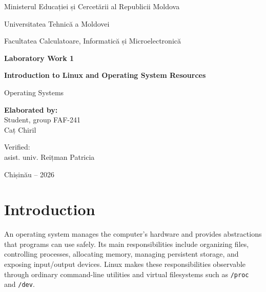 \documentclass[12pt]{article}
\newcommand{\commandname}[1]{\texttt{#1}}
\begin{document}

\begin{titlepage}
    \centering

    {\large Ministerul Educației și Cercetării al Republicii Moldova\par}
    \vspace{0.45cm}
    {\large Universitatea Tehnică a Moldovei\par}
    \vspace{0.45cm}
    {\large Facultatea Calculatoare, Informatică și Microelectronică\par}

    \vspace{3cm}

    {\Large\bfseries Laboratory Work 1\par}
    \vspace{0.55cm}
    {\LARGE\bfseries Introduction to Linux and Operating System Resources\par}
    \vspace{0.35cm}
    {\large Operating Systems\par}

    \vfill

    \begin{flushleft}
        \textbf{Elaborated by:}\\
        Student, group FAF-241\\
        Caț Chiril

        \vspace{1cm}

        Verified:\\
        asist. univ. Reițman Patricia
    \end{flushleft}

    \vfill

    {Chișinău -- 2026\par}
\end{titlepage}

\tableofcontents
\clearpage
{}

\section{Introduction}

An operating system manages the computer's hardware and provides abstractions that programs can use safely. Its main responsibilities include organizing files, controlling processes, allocating memory, managing persistent storage, and exposing input/output devices. Linux makes these responsibilities observable through ordinary command-line utilities and virtual filesystems such as \commandname{/proc} and \commandname{/dev}.
\end{document}
